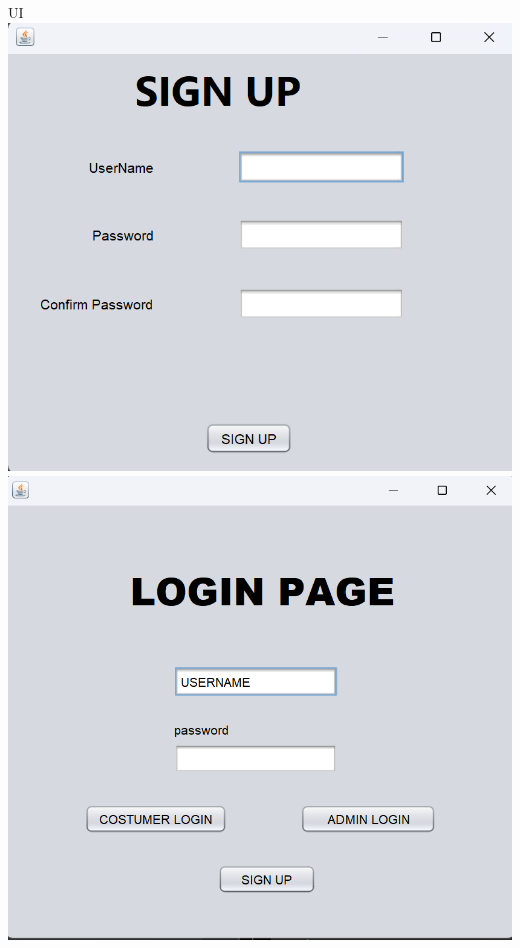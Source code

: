 \documentclass[a4paper,12pt]{report}
\begin{document}
\big UI
\\
\includegraphics[scale=0.5]{SIGNUP.png}
\includegraphics[scale=0.5]{LOGIN_PAGE.png}
\end{document}
